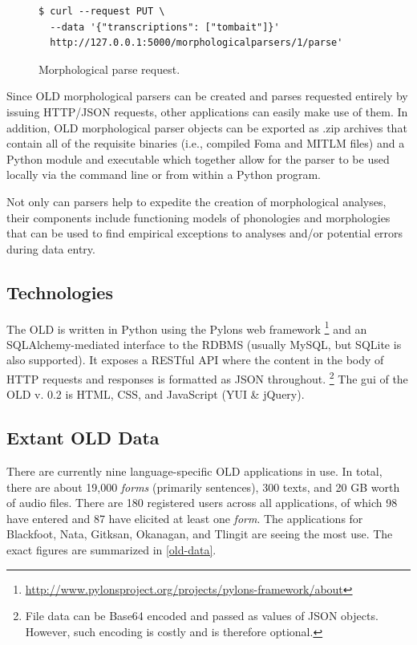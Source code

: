 \documentclass[11pt]{article}
\begin{document}
\begin{figure}[h]
\scriptsize
\begin{verbatim}
$ curl --request PUT \
  --data '{"transcriptions": ["tombait"]}'
  http://127.0.0.1:5000/morphologicalparsers/1/parse'
\end{verbatim}
\normalsize
\caption{Morphological parse request.}
\label{old-parse}
\end{figure}

Since OLD morphological parsers can be created and parses requested entirely by
issuing HTTP/JSON requests, other applications can easily make use of them. In
addition, OLD morphological parser objects can be exported as .zip archives
that contain all of the requisite binaries (i.e., compiled Foma and MITLM
files) and a Python module and executable which together allow for the parser
to be used locally via the command line or from within a Python program.

Not only can parsers help to expedite the creation of morphological analyses,
their components include functioning models of phonologies and morphologies that
can be used to find empirical exceptions to analyses and/or potential errors
during data entry.


\subsection{Technologies}

The OLD is written in Python using the Pylons web framework%
\footnote{\url{http://www.pylonsproject.org/projects/pylons-framework/about}} %
and an SQLAlchemy-mediated interface to the RDBMS (usually MySQL, but SQLite is also
supported). It exposes a RESTful API where the content in the body of HTTP 
requests and responses is formatted as JSON throughout.%
\footnote{File data can be Base64 encoded and passed as values of JSON objects.
However, such encoding is costly and is therefore optional.} %
The \gls{gui} of the OLD v. 0.2 is HTML, CSS, and JavaScript (YUI \& jQuery).


\subsection{Extant OLD Data}

There are currently nine language-specific OLD applications in use. In total,
there are about 19,000 \emph{forms} (primarily sentences), 300 texts, and 20 GB worth
of audio files.  There are 180 registered users across all applications, of
which 98 have entered and 87 have elicited at least one \emph{form}. The applications
for Blackfoot, Nata, Gitksan, Okanagan, and Tlingit are seeing the most use. The
exact figures are summarized in \autoref{old-data}.
\end{document}
